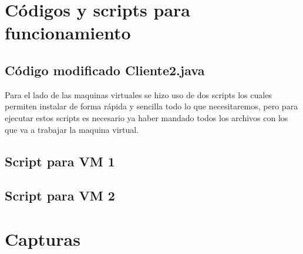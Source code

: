 \documentclass[10pt,executivepaper]{article}
\begin{document}
\section{Códigos y scripts para funcionamiento}
\subsection{Código modificado Cliente2.java}


Para el lado de las maquinas virtuales se hizo uso de dos scripts los cuales permiten instalar de forma rápida y sencilla todo lo que necesitaremos, pero para ejecutar estos scripts es necesario ya haber mandado todos los archivos con los que va a trabajar la maquina virtual.
\subsection{Script para VM 1}

\subsection{Script para VM 2}


\section{Capturas}
\end{document}
